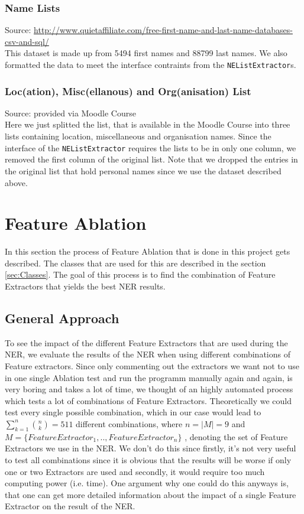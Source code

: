 \documentclass[11pt, english]{article}
\begin{document}
\subsubsection*{Name Lists}
Source: \url{http://www.quietaffiliate.com/free-first-name-and-last-name-databases-csv-and-sql/}\\
This dataset is made up from 5494 first names and 88799 last names. We also formatted the data to meet the interface contraints from the \verb/NEListExtractor/s. 

\subsubsection*{Loc(ation), Misc(ellanous) and Org(anisation) List}
Source: provided via Moodle Course\\
Here we just splitted the list, that is available in the Moodle Course into three lists containing location, miscellaneous and organisation names. Since the interface of the \verb/NEListExtractor/ requires the lists to be in only one column, we removed the first column of the original list. Note that we dropped the entries in the original list that hold personal names since we use the dataset described above.



\section{Feature Ablation}
\label{sec:Ablation}
In this section the process of Feature Ablation that is done in this project gets described. The classes that are used for this are described in the section \ref{sec:Classes}. The goal of this process is to find the combination of Feature Extractors that yields the best NER results.

\subsection{General Approach}
\label{sec:AblationApproach}
To see the impact of the different Feature Extractors that are used during the NER, we evaluate the results of the NER when using different combinations of Feature extractors. Since only commenting out the extractors we want not to use in one single Ablation test and run the programm manually again and again, is very boring and takes a lot of time, we thought of an highly automated process which tests a lot of combinations of Feature Extractors. Theoretically we could test every single possible combination, which in our case would lead to $\sum_{k=1}^{n}\binom{n}{k} = 511$ different combinations, where $n = \left | M \right | = 9$ and $M = \{ FeatureExtractor_1, ..,  FeatureExtractor_n \}$ , denoting the set of Feature Extractors we use in the NER. We don't do this since firstly, it's not very useful to test all combinations since it is obvious that the results will be worse if only one or two Extractors are used and secondly, it would require too much computing power (i.e. time). One argument why one could do this anyways is, that one can get more detailed information about the impact of a single Feature Extractor on the result of the NER.
\end{document}
